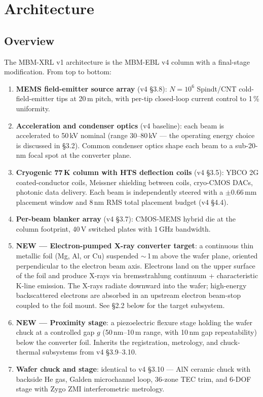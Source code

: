 \documentclass[11pt,letterpaper]{article}
\begin{document}
\section{Architecture}

\subsection{Overview}

The MBM-XRL v1 architecture is the MBM-EBL v4 column with a final-stage modification. From top to bottom:

\begin{enumerate}[leftmargin=1.6em]
  \item \textbf{MEMS field-emitter source array} (v4 \S 3.8): $N = 10^6$ Spindt/CNT cold-field-emitter tips at 20\,\textmu m pitch, with per-tip closed-loop current control to 1\,\% uniformity.
  \item \textbf{Acceleration and condenser optics} (v4 baseline): each beam is accelerated to 50\,kV nominal (range 30--80\,kV --- the operating energy choice is discussed in \S 3.2). Common condenser optics shape each beam to a sub-20-nm focal spot at the converter plane.
  \item \textbf{Cryogenic 77\,K column with HTS deflection coils} (v4 \S 3.5): YBCO 2G coated-conductor coils, Meissner shielding between coils, cryo-CMOS DACs, photonic data delivery. Each beam is independently steered with a $\pm 0.66$\,mm placement window and 8\,nm RMS total placement budget (v4 \S 4.4).
  \item \textbf{Per-beam blanker array} (v4 \S 3.7): CMOS-MEMS hybrid die at the column footprint, 40\,V switched plates with 1\,GHz bandwidth.
  \item \textbf{NEW --- Electron-pumped X-ray converter target}: a continuous thin metallic foil (Mg, Al, or Cu) suspended $\sim$\,1\,\textmu m above the wafer plane, oriented perpendicular to the electron beam axis. Electrons land on the upper surface of the foil and produce X-rays via bremsstrahlung continuum + characteristic K-line emission. The X-rays radiate downward into the wafer; high-energy backscattered electrons are absorbed in an upstream electron beam-stop coupled to the foil mount. See \S 2.2 below for the target subsystem.
  \item \textbf{NEW --- Proximity stage}: a piezoelectric flexure stage holding the wafer chuck at a controlled gap $g$ (50\,nm--10\,\textmu m range, with 10\,nm gap repeatability) below the converter foil. Inherits the registration, metrology, and chuck-thermal subsystems from v4 \S 3.9--3.10.
  \item \textbf{Wafer chuck and stage}: identical to v4 \S 3.10 --- AlN ceramic chuck with backside He gas, Galden microchannel loop, 36-zone TEC trim, and 6-DOF stage with Zygo ZMI interferometric metrology.
\end{enumerate}
\end{document}
